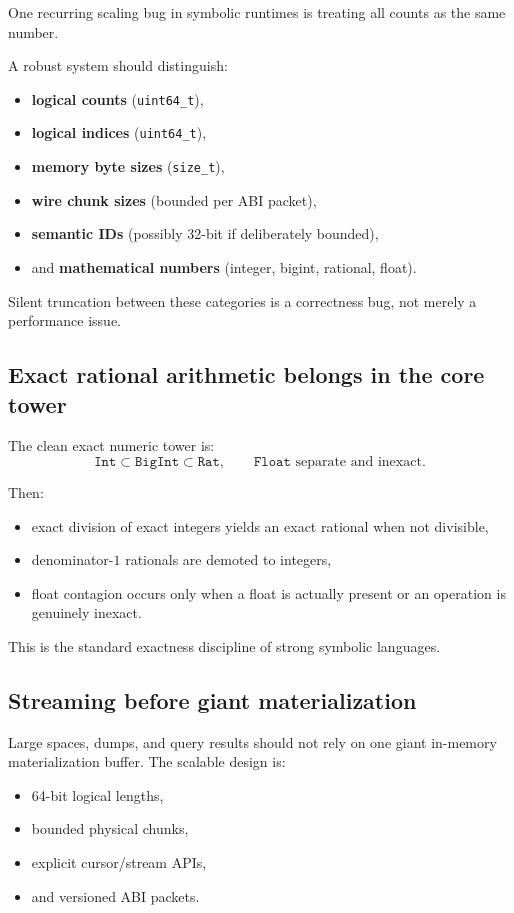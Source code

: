\documentclass[11pt]{article}
\begin{document}
One recurring scaling bug in symbolic runtimes is treating all counts as the same number.

A robust system should distinguish:
\begin{itemize}
    \item \textbf{logical counts} (\texttt{uint64\_t}),
    \item \textbf{logical indices} (\texttt{uint64\_t}),
    \item \textbf{memory byte sizes} (\texttt{size\_t}),
    \item \textbf{wire chunk sizes} (bounded per ABI packet),
    \item \textbf{semantic IDs} (possibly 32-bit if deliberately bounded),
    \item and \textbf{mathematical numbers} (integer, bigint, rational, float).
\end{itemize}

Silent truncation between these categories is a correctness bug, not merely a performance issue.

\subsection{Exact rational arithmetic belongs in the core tower}

The clean exact numeric tower is:
\[
\texttt{Int} \subset \texttt{BigInt} \subset \texttt{Rat}, \qquad \texttt{Float} \text{ separate and inexact.}
\]

Then:
\begin{itemize}
    \item exact division of exact integers yields an exact rational when not divisible,
    \item denominator-$1$ rationals are demoted to integers,
    \item float contagion occurs only when a float is actually present or an operation is genuinely inexact.
\end{itemize}

This is the standard exactness discipline of strong symbolic languages.

\subsection{Streaming before giant materialization}

Large spaces, dumps, and query results should not rely on one giant in-memory materialization buffer. The scalable design is:
\begin{itemize}
    \item 64-bit logical lengths,
    \item bounded physical chunks,
    \item explicit cursor/stream APIs,
    \item and versioned ABI packets.
\end{itemize}
\end{document}
